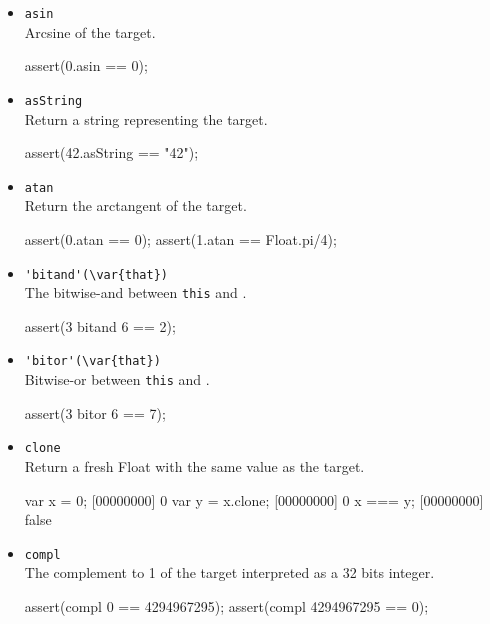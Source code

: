 \begin{itemize}
\begin{urbiscript}[firstnumber=last]
{  res = [];
  for&(var i : 3)
    res << i;
  assert(res.sort == [0, 1, 2]);
};
\end{urbiscript}%

\item \lstinline|asin|\\
  Arcsine of the target.
\begin{urbiscript}[firstnumber=last]
assert(0.asin == 0);
\end{urbiscript}

\item \lstinline|asString|\\
  Return a string representing the target.
\begin{urbiscript}[firstnumber=last]
assert(42.asString == "42");
\end{urbiscript}

\item \lstinline|atan|\\
  Return the arctangent of the target.
\begin{urbiscript}[firstnumber=last]
assert(0.atan == 0);
assert(1.atan == Float.pi/4);
\end{urbiscript}

\item \lstinline|'bitand'(\var{that})|\\
  The bitwise-and between \lstinline|this| and .
\begin{urbiscript}[firstnumber=last]
assert(3 bitand 6 == 2);
\end{urbiscript}

\item \lstinline|'bitor'(\var{that})|\\
  Bitwise-or between \lstinline|this| and .
\begin{urbiscript}[firstnumber=last]
assert(3 bitor 6 == 7);
\end{urbiscript}

\item \lstinline|clone|\\
  Return a fresh Float with the same value as the target.
\begin{urbiscript}[firstnumber=last]
var x = 0;
[00000000] 0
var y = x.clone;
[00000000] 0
x === y;
[00000000] false
\end{urbiscript}

\item \lstinline|compl|\\
  The complement to 1 of the target interpreted as a 32 bits integer.
\begin{urbiscript}[firstnumber=last]
assert(compl 0 == 4294967295);
assert(compl 4294967295 == 0);
\end{urbiscript}


\end{itemize}
